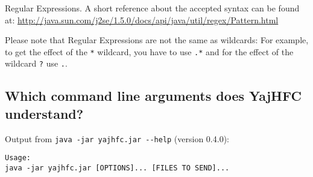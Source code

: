\documentclass[a4paper,10pt]{scrartcl}
\begin{document}
Regular Expressions. A short reference about the accepted syntax can be found at:
\url{http://java.sun.com/j2se/1.5.0/docs/api/java/util/regex/Pattern.html}

Please note that Regular Expressions are not the same as wildcards: 
For example, to get the effect of the \verb.*. wildcard, you have to use \verb#.*# and 
for the effect of the wildcard \verb#?# use \verb#.#.

\subsection{Which command line arguments does YajHFC understand?}

Output from \verb#java -jar yajhfc.jar --help# (version 0.4.0):
\begin{verbatim}
Usage:
java -jar yajhfc.jar [OPTIONS]... [FILES TO SEND]...


\end{verbatim}
\end{document}
